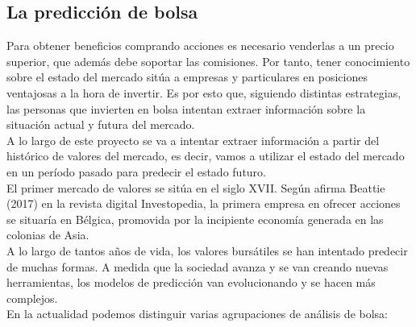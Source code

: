 \subsection{La predicci\'on de bolsa}

Para obtener beneficios comprando acciones es necesario venderlas a un precio superior, que adem\'as debe soportar las comisiones. Por tanto, tener conocimiento sobre el estado del mercado sit\'ua a empresas y particulares en posiciones ventajosas a la hora de invertir. Es por esto que, siguiendo distintas estrategias, las personas que invierten en bolsa intentan extraer informaci\'on sobre la situaci\'on actual y futura del mercado.\\

A lo largo de este proyecto se va a intentar extraer informaci\'on a partir del hist\'orico de valores del mercado, es decir, vamos a utilizar el estado del mercado en un per\'iodo pasado para predecir el estado futuro. \\

El primer mercado de valores se sit\'ua en el siglo XVII. Seg\'un afirma Beattie (2017) en la revista digital Investopedia, la primera empresa en ofrecer acciones se situar\'ia en B\'elgica, promovida por la incipiente econom\'ia generada en las colonias de Asia. \\

A lo largo de tantos a\~nos de vida, los valores burs\'atiles se han intentado predecir de muchas formas. A medida que la sociedad avanza y se van creando nuevas herramientas, los modelos de predicci\'on van evolucionando y se hacen m\'as complejos.\\

En la actualidad podemos distinguir varias agrupaciones de an\'alisis de bolsa:\\

